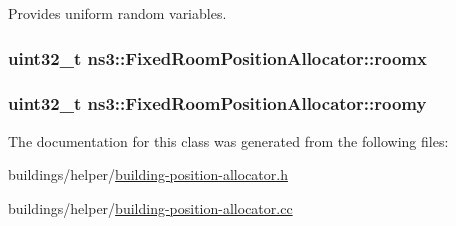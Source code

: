 Provides uniform random variables. 

\subsubsection[{\texorpdfstring{roomx}{roomx}}]{\setlength{\rightskip}{0pt plus 5cm}uint32\+\_\+t ns3\+::\+Fixed\+Room\+Position\+Allocator\+::roomx\hspace{0.3cm}{\ttfamily [private]}}\hypertarget{classns3_1_1FixedRoomPositionAllocator_a08406a888fd0dc8dc4e3e90663c32143}{}\label{classns3_1_1FixedRoomPositionAllocator_a08406a888fd0dc8dc4e3e90663c32143}
\subsubsection[{\texorpdfstring{roomy}{roomy}}]{\setlength{\rightskip}{0pt plus 5cm}uint32\+\_\+t ns3\+::\+Fixed\+Room\+Position\+Allocator\+::roomy\hspace{0.3cm}{\ttfamily [private]}}\hypertarget{classns3_1_1FixedRoomPositionAllocator_a08f9c20dddaeca5a037c2ffc53a530b8}{}\label{classns3_1_1FixedRoomPositionAllocator_a08f9c20dddaeca5a037c2ffc53a530b8}


The documentation for this class was generated from the following files\+:\begin{DoxyCompactItemize}
\item 
buildings/helper/\hyperlink{building-position-allocator_8h}{building-\/position-\/allocator.\+h}\item 
buildings/helper/\hyperlink{building-position-allocator_8cc}{building-\/position-\/allocator.\+cc}\end{DoxyCompactItemize}
